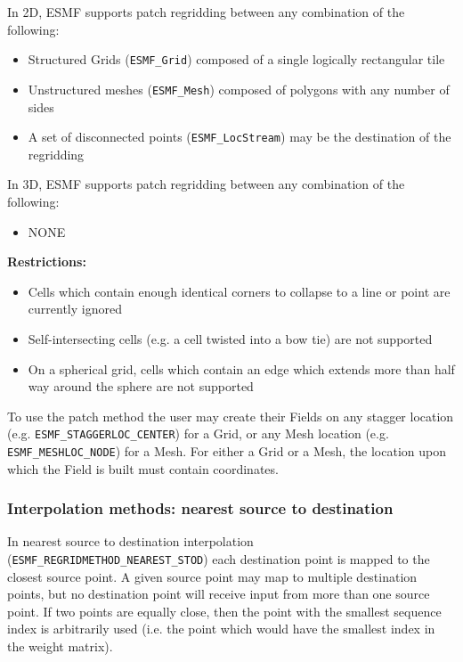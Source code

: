 \smallskip

 In 2D, ESMF supports patch regridding between any combination of the following:
 \begin{itemize}
 \item Structured Grids ({\tt ESMF\_Grid}) composed of a single logically rectangular tile
 \item Unstructured meshes ({\tt ESMF\_Mesh}) composed of polygons with any number of sides
 \item A set of disconnected points ({\tt ESMF\_LocStream}) may be the destination of the regridding
 \end{itemize}

\smallskip

 In 3D, ESMF supports patch regridding between any combination of the following:
 \begin{itemize}
 \item NONE
 \end{itemize}

\smallskip

{\bf Restrictions:}
 \begin{itemize}
 \item Cells which contain enough identical corners to collapse to a line or point are currently ignored
 \item Self-intersecting cells (e.g. a cell twisted into a bow tie) are not supported
 \item On a spherical grid, cells which contain an edge which extends more than half way around the sphere are not supported 
 \end{itemize}

 To use the patch method the user may create their Fields on any stagger location (e.g. {\tt ESMF\_STAGGERLOC\_CENTER}) for a Grid, or
 any Mesh location (e.g. {\tt ESMF\_MESHLOC\_NODE}) for a Mesh. For either a Grid or a Mesh, the location upon which the Field is built 
 must contain coordinates. 

\subsubsection{Interpolation methods: nearest source to destination}\label{sec:interpolation:neareststod}
In nearest source to destination interpolation ({\tt ESMF\_REGRIDMETHOD\_NEAREST\_STOD}) each destination point is mapped to the closest source point. A given source point may map to multiple destination points, but no destination point will receive input from more than one source point. If two points are equally close, then the point with the smallest sequence index is arbitrarily used (i.e. the point which would have the smallest index in the weight matrix). 

